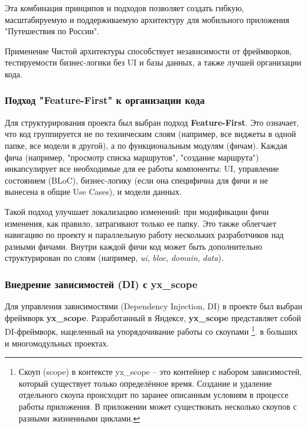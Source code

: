 Эта комбинация принципов и подходов позволяет создать гибкую, масштабируемую и поддерживаемую архитектуру для мобильного приложения "Путешествия по России".


Применение Чистой архитектуры способствует независимости от фреймворков, тестируемости бизнес-логики без UI и базы данных, а также лучшей организации кода.

\subsubsection*{Подход "Feature-First" к организации кода}
Для структурирования проекта был выбран подход \textbf{Feature-First}. Это означает, что код группируется не по техническим слоям (например, все виджеты в одной папке, все модели в другой), а по функциональным модулям (фичам). Каждая фича (например, "просмотр списка маршрутов", "создание маршрута") инкапсулирует все необходимые для ее работы компоненты: UI, управление состоянием (BLoC), бизнес-логику (если она специфична для фичи и не вынесена в общие Use Cases), и модели данных.

Такой подход улучшает локализацию изменений: при модификации фичи изменения, как правило, затрагивают только ее папку. Это также облегчает навигацию по проекту и параллельную работу нескольких разработчиков над разными фичами. Внутри каждой фичи код может быть дополнительно структурирован по слоям (например, \textit{ui}, \textit{bloc}, \textit{domain}, \textit{data}).



\subsubsection*{Внедрение зависимостей (DI) с yx\_scope}
Для управления зависимостями (Dependency Injection, DI) в проекте был выбран фреймворк \textbf{yx\_scope}. Разработанный в Яндексе, \textbf{yx\_scope} представляет собой DI-фреймворк, нацеленный на упорядочивание работы со скоупами \footnote{Скоуп (scope) в контексте yx\_scope – это контейнер с набором зависимостей, который существует только определённое время. Создание и удаление отдельного скоупа происходит по заранее описанным условиям в процессе работы приложения. В приложении может существовать несколько скоупов с разными жизненными циклами.}. в больших и многомодульных проектах.

